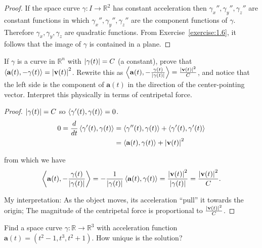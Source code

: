 \begin{proof}
	If the space curve $\gamma: I \to \mathbb{R}^{2}$ has constant acceleration then $\gamma_{x}'', \gamma_{y}'', \gamma_{z}''$ are constant functions in which $\gamma_{x}'', \gamma_{y}'', \gamma_{z}''$ are the component functions of $\gamma$. Therefore $\gamma_{x}, \gamma_{y}, \gamma_{z}$ are quadratic functions. From Exercise~\ref{exercise:1.6}, it follows that the image of $\gamma$ is contained in a plane.
\end{proof}

\begin{exercise}{1.27}
	If $\gamma$ is a curve in $\mathbb{R}^{n}$ with $\left\vert{\gamma(t)}\right\vert = C$ (a constant), prove that $\left\langle{\mathbf{a}(t), -\gamma(t)}\right\rangle = {\left\vert{\mathbf{v}(t)}\right\vert}^{2}$. Rewrite this as $\left\langle{\mathbf{a}(t), -\frac{\gamma(t)}{\left\vert{\gamma(t)}\right\vert}}\right\rangle = \frac{{\left\vert{\mathbf{v}(t)}\right\vert}^{2}}{C}$, and  notice that the left side is the component of $\mathbf{a}(t)$ in the direction of the center-pointing vector. Interpret this physically in terms of centripetal force.
\end{exercise}

\begin{proof}
	$\left\vert{\gamma(t)}\right\vert = C$ so $\left\langle{\gamma'(t), \gamma(t)}\right\rangle = 0$.
	\begin{align*}
		0 = \frac{d}{dt}\left\langle{\gamma'(t), \gamma(t)}\right\rangle & = \left\langle{\gamma''(t), \gamma(t)}\right\rangle + \left\langle{\gamma'(t), \gamma'(t)}\right\rangle \\
		                                                  & = \left\langle{\mathbf{a}(t), \gamma(t)}\right\rangle + \left\vert{\mathbf{v}(t)}\right\vert^{2}
	\end{align*}

	from which we have
	\begin{align*}
		\left\langle{\mathbf{a}(t), -\frac{\gamma(t)}{\left\vert{\gamma(t)}\right\vert}}\right\rangle = -\frac{1}{\left\vert{\gamma(t)}\right\vert}\left\langle{\mathbf{a}(t), \gamma(t)}\right\rangle = \frac{\left\vert{\mathbf{v}(t)}\right\vert^{2}}{\left\vert{\gamma(t)}\right\vert} = \frac{\left\vert{\mathbf{v}(t)}\right\vert^{2}}{C}.
	\end{align*}

	My interpretation: As the object moves, its acceleration ``pull'' it towards the origin; The magnitude of the centripetal force is proportional to $\frac{\left\vert{\mathbf{v}(t)}\right\vert^{2}}{C}$.
\end{proof}

\begin{exercise}{1.28}
	Find a space curve $\gamma: \mathbb{R} \to \mathbb{R}^{3}$ with acceleration function $\mathbf{a}(t) = (t^{2} - 1, t^{3}, t^{2} + 1)$. How unique is the solution?
\end{exercise}

